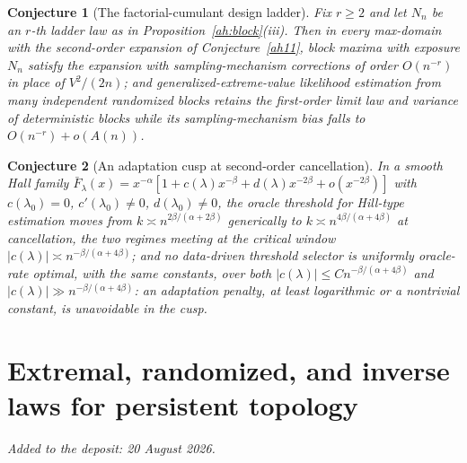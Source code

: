 \documentclass[11pt]{article}
\newtheorem{conjecture}{Conjecture}
\theoremstyle{definition}
\begin{document}
\begin{conjecture}[The factorial-cumulant design ladder]\label{ah12}
Fix $r\ge2$ and let $N_n$ be an $r$-th ladder law as in Proposition~\ref{ah:block}(iii).  Then in every max-domain with the second-order expansion of Conjecture~\ref{ah11}, block maxima with exposure $N_n$ satisfy the expansion with sampling-mechanism corrections of order $O(n^{-r})$ in place of $V^2/(2n)$; and generalized-extreme-value likelihood estimation from many independent randomized blocks retains the first-order limit law and variance of deterministic blocks while its sampling-mechanism bias falls to $O(n^{-r})+o(A(n))$.
\end{conjecture}

\begin{conjecture}[An adaptation cusp at second-order cancellation]\label{ah13}
In a smooth Hall family $\bar F_\lambda(x)=x^{-\alpha}[1+c(\lambda)x^{-\beta}+d(\lambda)x^{-2\beta}+o(x^{-2\beta})]$ with $c(\lambda_0)=0$, $c'(\lambda_0)\ne0$, $d(\lambda_0)\ne0$, the oracle threshold for Hill-type estimation moves from $k\asymp n^{2\beta/(\alpha+2\beta)}$ generically to $k\asymp n^{4\beta/(\alpha+4\beta)}$ at cancellation, the two regimes meeting at the critical window $|c(\lambda)|\asymp n^{-\beta/(\alpha+4\beta)}$; and no data-driven threshold selector is uniformly oracle-rate optimal, with the same constants, over both $|c(\lambda)|\le Cn^{-\beta/(\alpha+4\beta)}$ and $|c(\lambda)|\gg n^{-\beta/(\alpha+4\beta)}$: an adaptation penalty, at least logarithmic or a nontrivial constant, is unavoidable in the cusp.
\end{conjecture}


\part{Extremal, randomized, and inverse laws for persistent topology}

\medskip\noindent\emph{Added to the deposit: 20 August 2026.}\par\medskip
\end{document}

